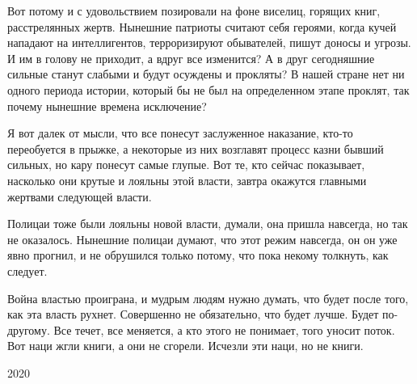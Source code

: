 Вот потому и с удовольствием позировали на фоне виселиц, горящих книг,
расстрелянных жертв. Нынешние патриоты считают себя героями, когда кучей
нападают на интеллигентов, терроризируют обывателей, пишут доносы и угрозы. И
им в голову не приходит, а вдруг все изменится? А в друг сегодняшние сильные
станут слабыми и будут осуждены и прокляты? В нашей стране нет ни одного
периода истории, который бы не был на определенном этапе проклят, так почему
нынешние времена исключение?

Я вот далек от мысли, что все понесут заслуженное наказание, кто-то переобуется
в прыжке, а некоторые из них возглавят процесс казни бывший сильных, но кару
понесут самые глупые. Вот те, кто сейчас показывает, насколько они крутые и
лояльны этой власти, завтра окажутся главными жертвами следующей власти.

Полицаи тоже были лояльны новой власти, думали, она пришла навсегда, но так не
оказалось.  Нынешние полицаи думают, что этот режим навсегда, он он уже явно
прогнил, и не обрушился только потому, что пока некому толкнуть, как следует. 

Война властью проиграна, и мудрым людям нужно думать, что будет после того, как
эта власть рухнет. Совершенно не обязательно, что будет лучше. Будет
по-другому. Все течет, все меняется, а кто этого не понимает, того уносит
поток. Вот наци жгли книги, а они не сгорели. Исчезли эти наци, но не книги.

2020

